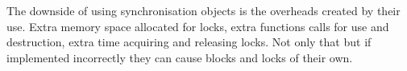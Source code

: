 \documentclass[11pt]{article} %
\begin{document}
The downside of using synchronisation objects is the overheads created by their use. Extra memory space allocated for locks, extra functions calls for use and destruction, extra time acquiring and releasing locks. Not only that but if implemented incorrectly they can cause blocks and locks of their own. \cite[Granularity]{ref15}




\end{document}
